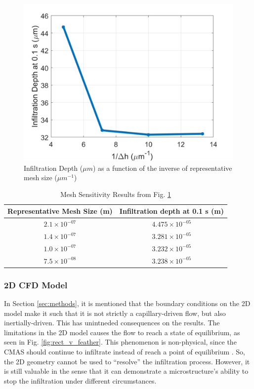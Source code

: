 \documentclass{UCF_ETD}
\begin{document}
\begin{figure}
    \centering
    \includegraphics[width=\linewidth]{Figures/infilDepthMesh.png}
    \caption{Infiltration Depth ($\mu m$) as a function of the inverse of representative mesh size ($\mu m ^{-1}$)}
    \label{fig:meshSensResults}
\end{figure}

\begin{table}[htp!]
    \centering
    \caption{Mesh Sensitivity Results from Fig. \ref{fig:meshSensResults}}
    \begin{tabular}{c|c}
       Representative Mesh Size (m)  & Infiltration depth at 0.1 s (m) \\
       \hline
        $2.1\times10^{-07}$ & $4.475\times10^{-05}$ \\
        $1.4\times10^{-07}$ & $3.281\times10^{-05}$ \\
        $1.0\times10^{-07}$ & $3.232\times10^{-05}$ \\
        $7.5\times10^{-08}$ & $3.238\times10^{-05}$
    \end{tabular}
    \label{tab:meshSensResults}
\end{table}

\subsubsection{2D CFD Model}
In Section \ref{sec:methods}, it is mentioned that the boundary conditions on the 2D model make it such that it is not strictly a capillary-driven flow, but also inertially-driven. This has unintneded consequences on the results. The limitations in the 2D model causes the flow to reach a state of equilibrium, as seen in Fig. \ref{fig:rect_v_feather}. This phenomenon is non-physical, since the CMAS should continue to infiltrate instead of reach a point of equilibrium \cite{Naraparaju2017}. So, the 2D geometry cannot be used to ``resolve'' the infiltration process. However, it is still valuable in the sense that it can demonstrate a microstructure's ability to stop the infiltration under different circumstances.
\end{document}
